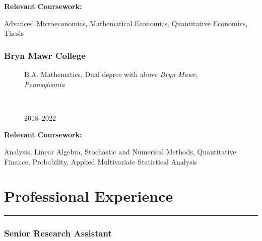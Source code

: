 \documentclass[
  letterpaper,
  DIV=11,
  numbers=noendperiod]{scrartcl}
\let\oldrule=\rule
\renewcommand{\rule}[1]{\oldrule{\linewidth}}
\begin{document}
\textbf{Relevant Coursework:}

Advanced Microeconomics, Mathematical Economics, Quantitative Economics,
Thesis

\hypertarget{bryn-mawr-college}{%
\subsubsection{Bryn Mawr College}\label{bryn-mawr-college}}

\begin{figure}

\begin{minipage}[t]{0.49\linewidth}

{\centering 

\RaggedRight B.A. Mathematics, Dual degree with above \newline
\emph{Bryn Mawr, Pennsylvania}

}

\end{minipage}%
%
\begin{minipage}[t]{0.02\linewidth}

{\centering 

~

}

\end{minipage}%
%
\begin{minipage}[t]{0.49\linewidth}

{\centering 

\RaggedLeft

2018--2022

}

\end{minipage}%

\end{figure}

\textbf{Relevant Coursework:}

Analysis, Linear Algebra, Stochastic and Numerical Methods, Quantitative
Finance, Probability, Applied Multivariate Statistical Analysis

\hypertarget{professional-experience}{%
\section{Professional Experience}\label{professional-experience}}

\begin{center}\rule{0.5\linewidth}{0.5pt}\end{center}

\hypertarget{senior-research-assistant}{%
\subsubsection{Senior Research
Assistant}\label{senior-research-assistant}}
\end{document}
